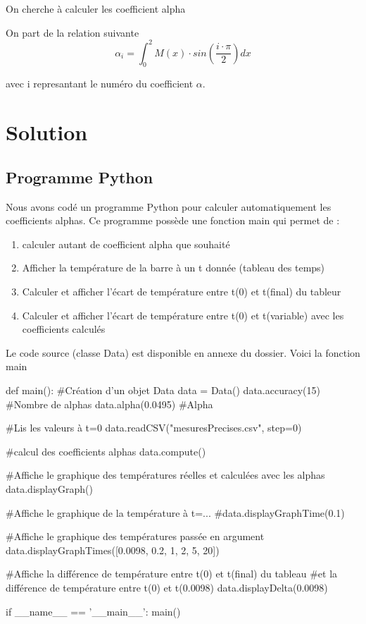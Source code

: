 On cherche à calculer les coefficient alpha

On part de la relation suivante
$$
\alpha_i =  \int_{0}^{2} M(x)\cdot sin(\frac{i\cdot \pi}{2}) dx
$$

avec i represantant le numéro du coefficient $ \alpha $.

\newpage 


\chapter{Solution}
\section{Programme Python}

Nous avons codé un programme Python pour calculer automatiquement les coefficients alphas. 
\newline
Ce programme possède une fonction main qui permet de :

\begin{enumerate}
    \item calculer autant de coefficient alpha que souhaité
    \item Afficher la température de la barre à un t donnée (tableau des temps)
    \item Calculer et afficher l'écart de température entre t(0) et t(final) du tableur
    \item Calculer et afficher l'écart de température entre t(0) et t(variable) avec les coefficients calculés
\end{enumerate}


Le code source (classe Data) est disponible en annexe du dossier.
Voici la fonction main

\begin{Python}
def main():
    #Création d'un objet Data
	data = Data() 													
	data.accuracy(15)   											#Nombre de alphas
	data.alpha(0.0495) 												#Alpha
	
	#Lis les valeurs à t=0
	data.readCSV("mesuresPrecises.csv", step=0)
	
	#calcul des coefficients alphas
	data.compute() 	
	
	#Affiche le graphique des températures réelles et calculées avec les alphas
	data.displayGraph()  
	
	#Affiche le graphique de la température à t=...
	#data.displayGraphTime(0.1)
	
	
	#Affiche le graphique des températures passée en argument
	data.displayGraphTimes([0.0098, 0.2, 1, 2,  5, 20])  	
	
    #Affiche la différence de température entre t(0) et t(final) du tableau
    #et la différence de température entre t(0) et t(0.0098)
	data.displayDelta(0.0098)

if __name__ == '__main__':
	main()
\end{Python}

